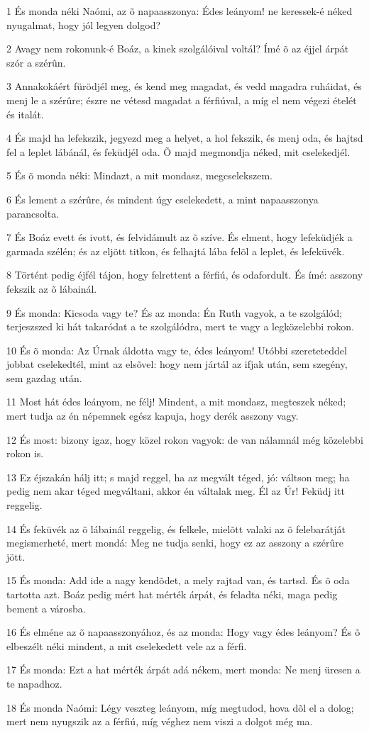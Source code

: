\par 1 És monda néki Naómi, az õ napaasszonya: Édes leányom! ne keressek-é néked nyugalmat, hogy jól legyen dolgod?
\par 2 Avagy nem rokonunk-é Boáz, a kinek szolgálóival voltál? Ímé õ az éjjel árpát szór a szérûn.
\par 3 Annakokáért fürödjél meg, és kend meg magadat, és vedd magadra ruháidat, és menj le a szérûre; észre ne vétesd magadat a férfiúval, a míg el nem végezi ételét és italát.
\par 4 És majd ha lefekszik, jegyezd meg a helyet, a hol fekszik, és menj oda, és hajtsd fel a leplet lábánál, és feküdjél oda. Õ majd megmondja néked, mit cselekedjél.
\par 5 És õ monda néki: Mindazt, a mit mondasz, megcselekszem.
\par 6 És lement a szérûre, és mindent úgy cselekedett, a mint napaasszonya parancsolta.
\par 7 És Boáz evett és ivott, és felvidámult az õ szíve. És elment, hogy lefeküdjék a garmada szélén; és az eljött titkon, és felhajtá lába felõl a leplet, és lefeküvék.
\par 8 Történt pedig éjfél tájon, hogy felrettent a férfiú, és odafordult. És ímé: asszony fekszik az õ lábainál.
\par 9 És monda: Kicsoda vagy te? És az monda: Én Ruth vagyok, a te szolgálód; terjeszszed ki hát takaródat a te szolgálódra, mert te vagy a legközelebbi rokon.
\par 10 És õ monda: Az Úrnak áldotta vagy te, édes leányom! Utóbbi szereteteddel jobbat cselekedtél, mint az elsõvel: hogy nem jártál az ifjak után, sem szegény, sem gazdag után.
\par 11 Most hát édes leányom, ne félj! Mindent, a mit mondasz, megteszek néked; mert tudja az én népemnek egész kapuja, hogy derék asszony vagy.
\par 12 És most: bizony igaz, hogy közel rokon vagyok: de van nálamnál még közelebbi rokon is.
\par 13 Ez éjszakán hálj itt; s majd reggel, ha az megvált téged, jó: váltson meg; ha pedig nem akar téged megváltani, akkor én váltalak meg.  Él az Úr! Feküdj itt reggelig.
\par 14 És feküvék az õ lábainál reggelig, és felkele, mielõtt valaki az õ felebarátját megismerheté, mert mondá: Meg ne tudja senki, hogy ez az asszony a szérûre jött.
\par 15 És monda: Add ide a nagy kendõdet, a mely rajtad van, és tartsd. És õ oda tartotta azt. Boáz pedig mért hat mérték árpát, és feladta néki, maga pedig bement a városba.
\par 16 És elméne az õ napaasszonyához, és az monda: Hogy vagy édes leányom? És õ elbeszélt néki mindent, a mit cselekedett vele az a férfi.
\par 17 És monda: Ezt a hat mérték árpát adá nékem, mert monda: Ne menj üresen a te napadhoz.
\par 18 És monda Naómi: Légy veszteg leányom, míg megtudod, hova dõl el a dolog; mert nem nyugszik az a férfiú, míg véghez nem viszi a dolgot még ma.

